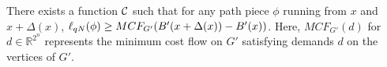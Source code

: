 \begin{lemma}\label{lem:flow} There exists a function $\mathcal{C}$ such that for
any
path piece $\phi$ running from $x$ and $x+\Delta(x)$, $\ell_{qN}(\phi) \geq
MCF_{G'}(B'(x+\Delta(x))-B'(x))$. Here, $MCF_{G'}(d)$ for $d \in
\mathbb{R}^{2^n}$ represents the minimum cost flow on $G'$ satisfying demands
$d$ on the vertices of $G'$.

\end{lemma}
